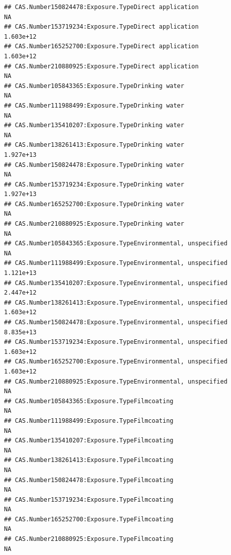 \documentclass[
  12pt,
]{article}
\begin{document}
\begin{verbatim}
## CAS.Number150824478:Exposure.TypeDirect application                                     NA
## CAS.Number153719234:Exposure.TypeDirect application                              1.603e+12
## CAS.Number165252700:Exposure.TypeDirect application                              1.603e+12
## CAS.Number210880925:Exposure.TypeDirect application                                     NA
## CAS.Number105843365:Exposure.TypeDrinking water                                         NA
## CAS.Number111988499:Exposure.TypeDrinking water                                         NA
## CAS.Number135410207:Exposure.TypeDrinking water                                         NA
## CAS.Number138261413:Exposure.TypeDrinking water                                  1.927e+13
## CAS.Number150824478:Exposure.TypeDrinking water                                         NA
## CAS.Number153719234:Exposure.TypeDrinking water                                  1.927e+13
## CAS.Number165252700:Exposure.TypeDrinking water                                         NA
## CAS.Number210880925:Exposure.TypeDrinking water                                         NA
## CAS.Number105843365:Exposure.TypeEnvironmental, unspecified                             NA
## CAS.Number111988499:Exposure.TypeEnvironmental, unspecified                      1.121e+13
## CAS.Number135410207:Exposure.TypeEnvironmental, unspecified                      2.447e+12
## CAS.Number138261413:Exposure.TypeEnvironmental, unspecified                      1.603e+12
## CAS.Number150824478:Exposure.TypeEnvironmental, unspecified                      8.835e+13
## CAS.Number153719234:Exposure.TypeEnvironmental, unspecified                      1.603e+12
## CAS.Number165252700:Exposure.TypeEnvironmental, unspecified                      1.603e+12
## CAS.Number210880925:Exposure.TypeEnvironmental, unspecified                             NA
## CAS.Number105843365:Exposure.TypeFilmcoating                                            NA
## CAS.Number111988499:Exposure.TypeFilmcoating                                            NA
## CAS.Number135410207:Exposure.TypeFilmcoating                                            NA
## CAS.Number138261413:Exposure.TypeFilmcoating                                            NA
## CAS.Number150824478:Exposure.TypeFilmcoating                                            NA
## CAS.Number153719234:Exposure.TypeFilmcoating                                            NA
## CAS.Number165252700:Exposure.TypeFilmcoating                                            NA
## CAS.Number210880925:Exposure.TypeFilmcoating                                            NA

\end{verbatim}
\end{document}
